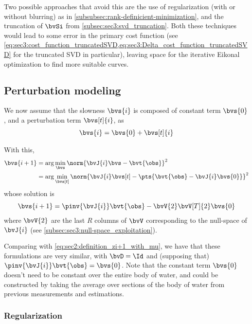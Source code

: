 Two possible approaches that avoid this are the use of regularization (with or without blurring) as in \cref{subsubsec:rank-definicient-minimization}, and the truncation of $\bvSi$ from \cref{subsec:sec3:svd_truncation}. Both these techniques would lead to some error in the primary cost function (see \cref{eq:sec3:cost_function_truncatedSVD,eq:sec3:Delta_cost_function_truncatedSVD} for the truncated SVD in particular), leaving space for the iterative Eikonal optimization to find more suitable curves.

\subsection{Perturbation modeling}

We now assume that the slowness $\bvs{i}$ is composed of constant term $\bvs{0}$, and a perturbation term $\bvs[t]{i}$, as
\begin{equation}
	\bvs{i} = \bvs{0} + \bvs[t]{i}
\end{equation}

With this,
\begin{equation}
	\begin{split}
		\bvs{i+1}
		& = \arg \min_{\bvs} \norm{\bvJ{i} \bvs - \bvt{\obs}}^2 \\
		& = \arg \min_{\bvs[t]} \norm{\bvJ{i} \bvs[t] - \pts{\bvt{\obs} - \bvJ{i}\bvs{0}}}^2
	\end{split}
\end{equation}
whose solution is
\begin{equation}
	\bvs{i+1} =  \pinv{\bvJ{i}} \bvt{\obs} - \bvV{2}\bvV[T]{2} \bvs{0}
	\label{eq:sec4:bvz_perturbation_model}
\end{equation}
where $\bvV{2}$ are the last $R$ columns of $\bvV$ corresponding to the null-space of $\bvJ{i}$ (see \cref{subsec:sec3:null-space_exploitation}).

Comparing with \cref{eq:sec2:definition_zi+1_with_mu}, we have that these formulations are very similar, with $\bvD = \Id$ and (supposing that) $\pinv{\bvJ{i}} \bvt{\obs} = \bvs{0}$. Note that the constant term $\bvs{0}$ doesn't need to be constant over the entire body of water, and could be constructed by taking the average over sections of the body of water from previous measurements and estimations.

\subsubsection{Regularization}

